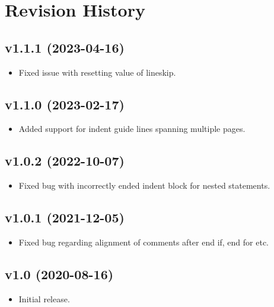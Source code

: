 \documentclass[11pt,a4paper,USenglish]{article}
\begin{document}
\section{Revision History}

\subsection*{v1.1.1 (2023-04-16)}
\begin{itemize}
	\item Fixed issue with resetting value of lineskip.
\end{itemize}

\subsection*{v1.1.0 (2023-02-17)}
\begin{itemize}
	\item Added support for indent guide lines spanning multiple pages.
\end{itemize}

\subsection*{v1.0.2 (2022-10-07)}
\begin{itemize}
	\item Fixed bug with incorrectly ended indent block for nested statements.
\end{itemize}

\subsection*{v1.0.1 (2021-12-05)}
\begin{itemize}
	\item Fixed bug regarding alignment of comments after end if, end for etc.
\end{itemize}

\subsection*{v1.0 (2020-08-16)}
\begin{itemize}
	\item Initial release.
\end{itemize}
\end{document}
